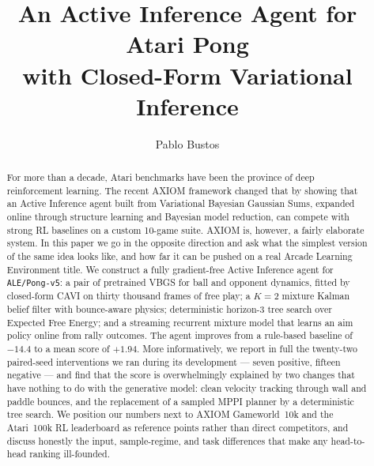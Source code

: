 \documentclass[runningheads]{llncs}
\begin{document}
\title{An Active Inference Agent for Atari Pong\\
       with Closed-Form Variational Inference}

\author{Pablo Bustos}
\maketitle

\begin{abstract}
For more than a decade, Atari benchmarks have been the province of
deep reinforcement learning. The recent AXIOM framework changed that
by showing that an Active Inference agent built from
Variational Bayesian Gaussian Sums, expanded online through structure
learning and Bayesian model reduction, can compete with strong
RL baselines on a custom 10-game suite. AXIOM is, however, a fairly
elaborate system. In this paper we go in the opposite direction and
ask what the simplest version of the same idea looks like, and how
far it can be pushed on a real Arcade Learning Environment title. We
construct a fully gradient-free Active Inference agent for
\texttt{ALE/Pong-v5}: a pair of pretrained VBGS for ball and opponent
dynamics, fitted by closed-form CAVI on thirty thousand frames of
free play; a $K{=}2$ mixture Kalman belief filter with bounce-aware
physics; deterministic horizon-3 tree search over Expected Free
Energy; and a streaming recurrent mixture model that learns an aim
policy online from rally outcomes. The agent improves from a
rule-based baseline of $-14.4$ to a mean score of $+1.94$. More
informatively, we report in full the twenty-two paired-seed
interventions we ran during its development --- seven positive,
fifteen negative --- and find that the score is overwhelmingly
explained by two changes that have nothing to do with the
generative model: clean velocity tracking through wall and paddle
bounces, and the replacement of a sampled MPPI planner by a
deterministic tree search. We position our numbers next to AXIOM
Gameworld~10k and the Atari~100k RL leaderboard as reference points
rather than direct competitors, and discuss honestly the input,
sample-regime, and task differences that make any head-to-head
ranking ill-founded.

\end{abstract}
\end{document}
